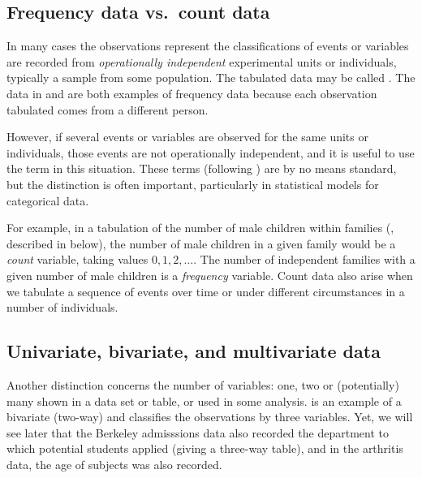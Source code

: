 \documentclass[11pt]{book}\usepackage[]{graphicx}\usepackage[]{color}
\begin{document}
\subsection{Frequency data vs.\ count data}\label{sec:freq-count}
In many cases the observations represent the classifications of events or variables are 
recorded from \emph{operationally independent} experimental units or individuals, typically
a sample from some population.  The tabulated data may be called
.  The data in  and 
are both examples of frequency data because each observation tabulated
comes from a different person.

However, if several events or variables are observed for the same units or individuals, those events are not
operationally independent, and it is useful to use the term 
 in this situation.  These terms (following
\citet{Lindsey:95}) are by no means standard, but
the distinction is often important, particularly in statistical
models for categorical data.  

For example, in a tabulation of the number of male
children within families (, described in
 below), 
the number of male children in a given family would be a \emph{count} variable,
taking values $0, 1, 2, \dots$.  The number of independent families with
a given number of male children is a \emph{frequency} variable.
Count data also arise when we tabulate a sequence of events over time
or under different circumstances in a number of individuals.



\subsection{Univariate, bivariate, and multivariate data}\label{sec:uni-multi}
Another distinction concerns the number of variables: one, two or
(potentially) many shown in a data set or table, or used in some
analysis.
 is an example of a bivariate (two-way) \ctab
and  classifies the observations by three variables.
Yet, we will see later
that the Berkeley admisssions data also recorded
the department to which potential students applied (giving a three-way
table), and in the arthritis data, the age of subjects was also
recorded.
\end{document}
